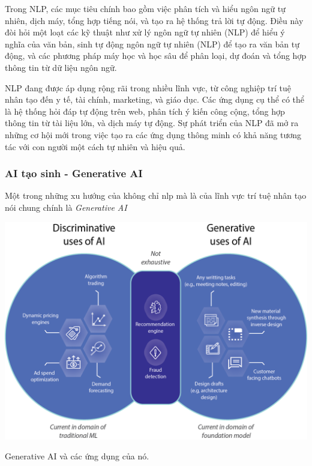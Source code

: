 \documentclass[a4paper, 12pt, openany]{book}
\begin{document}
Trong NLP, các mục tiêu chính bao gồm việc phân tích và hiểu ngôn ngữ tự nhiên, dịch máy, tổng hợp tiếng nói, và tạo ra hệ thống trả lời tự động. Điều này đòi hỏi một loạt các kỹ thuật như xử lý ngôn ngữ tự nhiên (NLP) để hiểu ý nghĩa của văn bản, sinh tự động ngôn ngữ tự nhiên (NLP) để tạo ra văn bản tự động, và các phương pháp máy học và học sâu để phân loại, dự đoán và tổng hợp thông tin từ dữ liệu ngôn ngữ.

NLP đang được áp dụng rộng rãi trong nhiều lĩnh vực, từ công nghiệp trí tuệ nhân tạo đến y tế, tài chính, marketing, và giáo dục. Các ứng dụng cụ thể có thể là hệ thống hỏi đáp tự động trên web, phân tích ý kiến công cộng, tổng hợp thông tin từ tài liệu lớn, và dịch máy tự động. Sự phát triển của NLP đã mở ra những cơ hội mới trong việc tạo ra các ứng dụng thông minh có khả năng tương tác với con người một cách tự nhiên và hiệu quả.

\subsubsection{AI tạo sinh - Generative AI}

Một trong những xu hướng của không chỉ \acl{nlp} mà là của lĩnh vực trí tuệ nhân tạo nói chung chính là \textit{Generative AI}

\vspace{0.5cm}
\begin{minipage}{\linewidth}
    \captionsetup{type=figure}
    \centering
    \includegraphics[width=\linewidth]{./assets/images/generative-ai-benefits.png}
    \caption{Generative AI và các ứng dụng của nó.}
\end{minipage}
\vspace{0.5cm}
\end{document}
